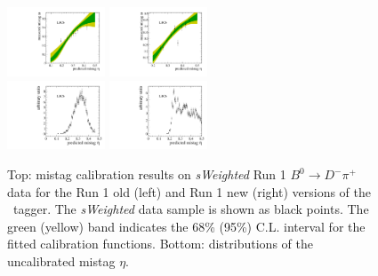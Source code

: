 \begin{figure}[ht!]
        \centering
        \includegraphics[width=0.26\textwidth]{04FlavourTagging/figs/OSelectronOpt/run1data_old/OS_Electron_InputCalibration.pdf}
        \includegraphics[width=0.26\textwidth]{04FlavourTagging/figs/OSelectronOpt/run1data_new/OS_Electron_InputCalibration.pdf} \\
        \includegraphics[width=0.26\textwidth]{04FlavourTagging/figs/OSelectronOpt/run1data_old/OS_Electron_EtaDist.pdf}
        \includegraphics[width=0.26\textwidth]{04FlavourTagging/figs/OSelectronOpt/run1data_new/OS_Electron_EtaDist.pdf}
        \vspace{-2mm}
        \caption{Top: mistag calibration results on \emph{sWeighted} Run 1 $B^0\to D^-\pi^+$ data for the Run 1 old (left) and Run 1 new (right) versions of the \OSe~tagger. The \emph{sWeighted} data sample is shown as black points. The green (yellow) band indicates the 68\% (95\%) C.L. interval for the fitted calibration functions. Bottom: distributions of the uncalibrated mistag $\eta$.}
        \label{fig:OSePerfCalib1}
\end{figure}

